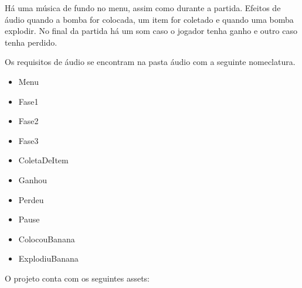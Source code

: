 \documentclass[12pt]{article}
\begin{document}
	Há uma música de fundo no menu, assim como durante a
	partida. Efeitos de áudio quando a bomba for colocada,
	um item for coletado e quando uma bomba explodir. No
	final da partida há um som caso o jogador tenha ganho e
	outro caso tenha perdido.

	Os requisitos de áudio se encontram na pasta áudio
	com a seguinte nomeclatura.

	\begin{itemize}
		\item Menu
		\item Fase1
		\item Fase2
		\item Fase3
		\item ColetaDeItem
		\item Ganhou
		\item Perdeu
		\item Pause
		\item ColocouBanana
		\item ExplodiuBanana
	\end{itemize}

	O projeto conta com os seguintes assets:
\end{document}
